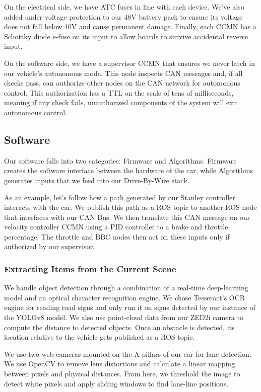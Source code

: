 On the electrical side, we have ATC fuses in line with each device.
We've also added under-voltage protection to our 48V battery pack to
ensure its voltage does not fall below 40V and cause permanent damage.
Finally, each CCMN has a Schottky diode e-fuse on its input to allow
boards to survive accidental reverse input.

On the software side, we have a supervisor CCMN that ensures we never
latch in our vehicle's autonomous mode. This node inspects CAN messages
and, if all checks pass, can authorize other nodes on the CAN network
for autonomous control. This authorization has a TTL on the scale of
tens of milliseconds, meaning if any check fails, unauthorized
components of the system will exit autonomous control.

\subsection{Software}

Our software falls into two categories: Firmware and Algorithms.
Firmware creates the software interface between the hardware of the
car, while Algorithms generates inputs that we feed into our
Drive-By-Wire stack.

As an example, let's follow how a path generated by our Stanley
controller interacts with the car. We publish this path as a ROS topic
to another ROS node that interfaces with our CAN Bus. We then translate
this CAN message on our velocity controller CCMN using a PID controller
to a brake and throttle percentage. The throttle and BBC nodes then act
on these inputs only if authorized by our supervisor.

\subsubsection{Extracting Items from the Current Scene}

We handle object detection through a combination of a real-time
deep-learning model and an optical character recognition engine. We
chose Tesseract's OCR engine for reading road signs and only run it on
signs detected by our instance of the YOLOv8 model. We also use
point-cloud data from our ZED2i camera to compute the distance to
detected objects. Once an obstacle is detected, its location relative
to the vehicle gets published as a ROS topic.

We use two web cameras mounted on the A-pillars of our car for lane
detection. We use OpenCV to remove lens distortions and calculate a
linear mapping between pixels and physical distances. From here, we
threshold the image to detect white pixels and apply sliding windows to
find lane-line positions.

